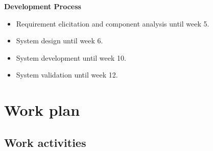 \documentclass[11pt, a4paper]{article}
\begin{document}
\textbf{Development Process}
\begin{itemize}
\item {Requirement elicitation and component analysis until week 5. }
\item {System design until week 6. }
\item {System development until week 10. }
\item {System validation until week 12. }
\end{itemize}
\newpage

\section{Work plan}
\subsection{Work activities}
\end{document}
